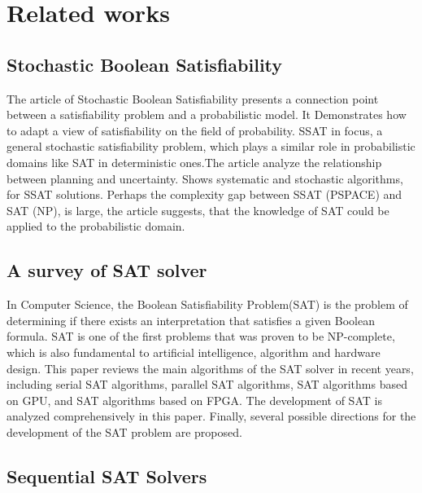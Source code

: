 \documentclass{article}
\begin{document}
\section{Related works}
\label{sec:relwork}

\subsection{Stochastic Boolean Satisfiability \cite{sbs}}

The article of Stochastic Boolean Satisfiability presents a connection point between a satisfiability problem and a probabilistic model. It Demonstrates how to adapt a view of satisfiability on the field of probability. SSAT in focus, a general stochastic satisfiability problem, which plays a similar role in probabilistic domains like SAT in deterministic ones.The article analyze the relationship between planning and uncertainty. Shows systematic and stochastic algorithms, for SSAT solutions. Perhaps the complexity gap between SSAT (PSPACE) and SAT (NP), is large, the article suggests, that the knowledge of SAT could be applied to the probabilistic domain.

\subsection{A survey of SAT solver \cite{surveyOfSatSolvers}}

In Computer Science, the Boolean Satisfiability Problem(SAT) is the problem of determining if there exists an interpretation that satisfies a given Boolean formula. SAT is one of the first problems that was proven to be NP-complete, which is also fundamental to artificial intelligence, algorithm and hardware design. This paper reviews the main algorithms of the SAT solver in recent years, including serial SAT algorithms, parallel SAT algorithms, SAT algorithms based on GPU, and SAT algorithms based on FPGA. The development of SAT is analyzed comprehensively in this paper. Finally, several possible directions for the development of the SAT problem are proposed.

\subsection{Sequential SAT Solvers}
\end{document}
